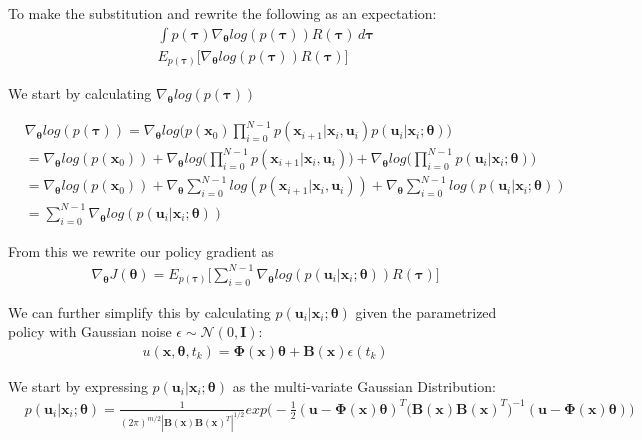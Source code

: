\documentclass[11pt]{homework}
\renewcommand{\vec}[1]{\ensuremath{\boldsymbol{#1}}}
\begin{document}
\begin{arabicparts}
		To make the substitution and rewrite the following as an expectation:
		\begin{align*}
			& \int p(\vec{\tau})\nabla_{\vec{\theta}} log(p(\vec{\tau}))R(\vec{\tau}) \,d\vec{\tau} \\
			& E_{p(\vec{\tau})}\Bigg[\nabla_{\vec{\theta}} log(p(\vec{\tau}))R(\vec{\tau})\Bigg]
		\end{align*}

	We start by calculating $\nabla_{\vec{\theta}} log(p(\vec{\tau}))$ 

		\begin{align*}
			& \nabla_{\vec{\theta}} log(p(\vec{\tau})) = \nabla_{\vec{\theta}}log\Bigg( p(\vec{x}_0)\prod_{i=0}^{N-1} p(\vec{x}_{i+1}|\vec{x}_i,\vec{u}_i)p(\vec{u}_{i}|\vec{x}_{i};\vec{\theta}) \Bigg) \\
			& = \nabla_{\vec{\theta}}log(p(\vec{x}_0)) + \nabla_{\vec{\theta}}log\Bigg( \prod_{i=0}^{N-1} p(\vec{x}_{i+1}|\vec{x}_i,\vec{u}_i)\Bigg) +  \nabla_{\vec{\theta}}log\Bigg( \prod_{i=0}^{N-1}p(\vec{u}_{i}|\vec{x}_{i};\vec{\theta})\Bigg) \\
			& = \nabla_{\vec{\theta}}log(p(\vec{x}_0)) + \nabla_{\vec{\theta}}\sum_{i=0}^{N-1} log(p(\vec{x}_{i+1}|\vec{x}_i,\vec{u}_i)) +  \nabla_{\vec{\theta}}\sum_{i=0}^{N-1}log(p(\vec{u}_{i}|\vec{x}_{i};\vec{\theta})) \\
			& = \sum_{i=0}^{N-1}\nabla_{\vec{\theta}}log(p(\vec{u}_{i}|\vec{x}_{i};\vec{\theta}))
		\end{align*}

	From this we rewrite our policy gradient as
		\begin{align*}
			& \nabla_{\vec{\theta}}J(\vec{\theta}) = E_{p(\vec{\tau})}\Bigg[\sum_{i=0}^{N-1}\nabla_{\vec{\theta}}log(p(\vec{u}_{i}|\vec{x}_{i};\vec{\theta}))R(\vec{\tau})\Bigg]
		\end{align*}

	We can further simplify this by calculating $p(\vec{u}_{i}|\vec{x}_{i};\vec{\theta})$ given the parametrized policy with Gaussian noise $\epsilon \sim \mathcal{N}(0,\vec{I})$:
		\begin{align*}
			& u(\vec{x}, \vec{\theta},t_{k}) = \vec{\Phi}(\vec{x})\vec{\theta} + \vec{B}(\vec{x})\epsilon(t_{k})
		\end{align*}

	We start by expressing $p(\vec{u}_{i}|\vec{x}_{i};\vec{\theta})$ as the multi-variate Gaussian Distribution: 
		\begin{align*}
			& p(\vec{u}_{i}|\vec{x}_{i};\vec{\theta}) = \frac{1}{(2\pi)^{m/2}| \vec{B}(\vec{x})\vec{B}(\vec{x})^{T}|^{1/2}}exp\Bigg( -\frac{1}{2}(\vec{u} - \vec{\Phi}(\vec{x})\vec{\theta})^{T}\Big(\vec{B}(\vec{x})\vec{B}(\vec{x})^T\Big)^{-1}(\vec{u}-\vec{\Phi}(\vec{x})\vec{\theta})  \Bigg)\\
		\end{align*}
	

\end{arabicparts}
\end{document}

